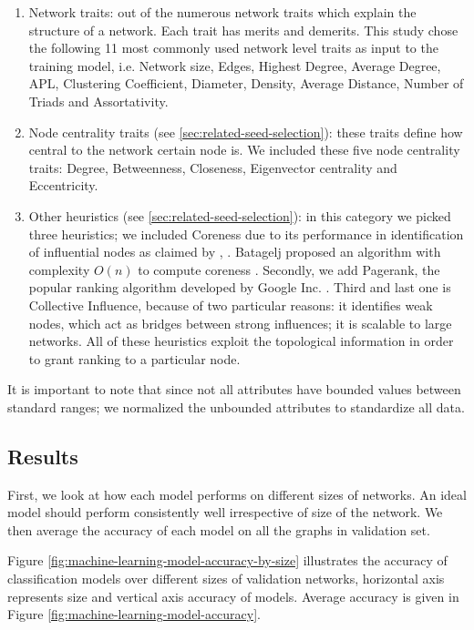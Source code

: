 		\begin{enumerate}
			\item Network traits: out of the numerous network traits which explain the structure of a network. Each trait has merits and demerits. This study chose the following 11 most commonly used network level traits as input to the training model, i.e. Network size, Edges, Highest Degree, Average Degree, APL, Clustering Coefficient, Diameter, Density, Average Distance, Number of Triads and Assortativity.
			
			\item Node centrality traits (see \ref{sec:related-seed-selection}): these traits define how central to the network certain node is. We included these five node centrality traits: Degree, Betweenness, Closeness, Eigenvector centrality and Eccentricity.
			
			\item Other heuristics (see \ref{sec:related-seed-selection}): in this category we picked three heuristics; we included Coreness due to its performance in identification of influential nodes as claimed by \cite{kitsak2010}, \cite{bae2014}. Batagelj proposed an algorithm with complexity $O(n)$ to compute coreness \cite{batagelj2003}. Secondly, we add Pagerank, the popular ranking algorithm developed by Google Inc. \cite{pagerank1999}. Third and last one is Collective Influence, because of two particular reasons: it identifies weak nodes, which act as bridges between strong influences; it is scalable to large networks. All of these heuristics exploit the topological information in order to grant ranking to a particular node.
		\end{enumerate}
		
		It is important to note that since not all attributes have bounded values between standard ranges; we normalized the unbounded attributes to standardize all data.
		
		\subsection{Results}
		First, we look at how each model performs on different sizes of networks. An ideal model should perform consistently well irrespective of size of the network. We then average the accuracy of each model on all the graphs in validation set.
		
		Figure \ref{fig:machine-learning-model-accuracy-by-size} illustrates the accuracy of classification models over different sizes of validation networks, horizontal axis represents size and vertical axis accuracy of models. Average accuracy is given in Figure \ref{fig:machine-learning-model-accuracy}.
		
